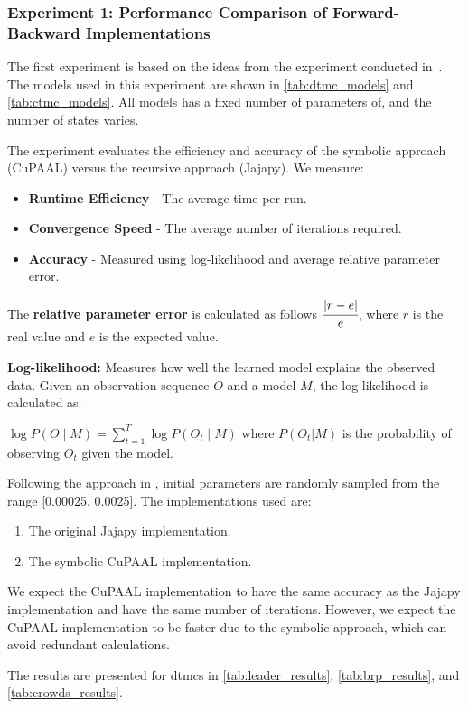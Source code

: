 \subsubsection{Experiment 1: Performance Comparison of Forward-Backward Implementations}
The first experiment is based on the ideas from the experiment conducted in~\cite{reynouard2024learning}.
The models used in this experiment are shown in \autoref{tab:dtmc_models} and \autoref{tab:ctmc_models}.
All models has a fixed number of parameters of, and the number of states varies.

The experiment evaluates the efficiency and accuracy of the symbolic approach (CuPAAL) versus the recursive approach (Jajapy). We measure:
\begin{itemize}
    \item \textbf{Runtime Efficiency} - The average time per run.
    \item \textbf{Convergence Speed} - The average number of iterations required.
    \item \textbf{Accuracy} - Measured using log-likelihood and average relative parameter error.
\end{itemize}

The \textbf{relative parameter error} is calculated as follows $\cfrac{|r-e|}{e}$, where $r$ is the real value and $e$ is the expected value.

\textbf{Log-likelihood:} Measures how well the learned model explains the observed data. Given an observation sequence $O$ and a model $M$, the log-likelihood is calculated as:

$\log P(O \mid M) = \sum_{t=1}^{T} \log P(O_t \mid M)$ where $P(O_t|M)$ is the probability of observing $O_t$ given the model.

Following the approach in \cite{bacci2023mm}, initial parameters are randomly sampled from the range
    [0.00025, 0.0025]. The implementations used are:
\begin{enumerate}
    \item The original Jajapy implementation.
    \item The symbolic CuPAAL implementation.
\end{enumerate}

We expect the CuPAAL implementation to have the same accuracy as the Jajapy implementation and have the same number of iterations. However, we expect the CuPAAL implementation to be faster due to the symbolic approach, which can avoid redundant calculations.

The results are presented for \glspl{dtmc} in \autoref{tab:leader_results}, \autoref{tab:brp_results}, and \autoref{tab:crowds_results}.

